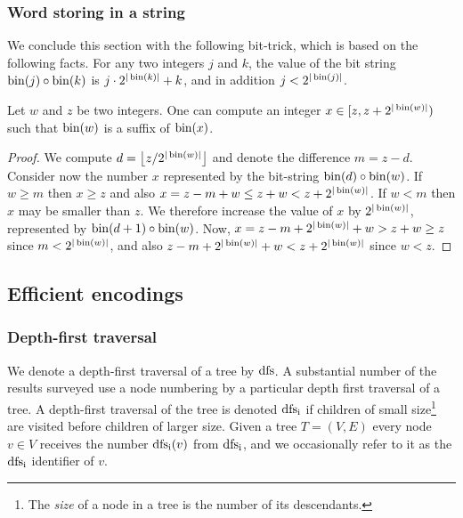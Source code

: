 \subsubsection{Word storing in a string}\label{tec:wordinside}
	We conclude this section with the following  bit-trick, which is based on the following facts.
	For any two integers $j$ and $k$, the value of the bit string $\operatorname{bin}(j) \circ \operatorname{bin}(k)$ is $j \cdot 2^{\vert\operatorname{bin}(k)\vert}+k$, and in addition $j<2^{\vert \operatorname{bin}(j)\vert}$.
			\begin{lemma} \label{lemma:numberinside}
			Let $w$ and $z$ be two integers. One can compute  an integer $x \in [z,z+2^{ \vert \operatorname{bin}(w) \vert} )$ such that $\operatorname{bin}(w)$ is a suffix of $\operatorname{bin}(x)$.
			\end{lemma}
			\begin{proof}
			 We  compute $d = \left\lfloor{z/ 2^{\vert \operatorname{bin}(w) \vert}}\right\rfloor$ and denote the difference $m = z-d$.
			 Consider now the number $x$ represented by the bit-string $ \operatorname{bin}(d) \circ \operatorname{bin}(w)$.
			 If $w \geq m$  then $x \geq z$ and also   $x=z-m+w \leq z+w < z + 2^{\vert  \operatorname{bin}(w) \vert}$. 
			 If $w < m$ then $x$ may be smaller than $z$. 
			 We therefore increase the value of  $x$ by  $2^{\vert \operatorname{bin}(w) \vert}$, represented by  $\operatorname{bin}(d+1) \circ \operatorname{bin}(w)$.	
			 Now, $x = z- m + 2^{\vert  \operatorname{bin}(w) \vert}  + w > z + w \geq z$ since $m< 2^{\vert \operatorname{bin}(w) \vert}$, and also $z-m+ 2^{\vert \operatorname{bin}(w) \vert} +w < z +  2^{\vert \operatorname{bin}(w) \vert}$ since $w<z$. 
			 \end{proof}
			
\subsection{Efficient encodings}\label{sec:efficient-encoding}
\subsubsection{ Depth-first traversal}\label{tec:dfs}
We denote a depth-first traversal of a tree by $\operatorname{dfs}$.
A substantial number of the results surveyed use  a node numbering  by a  particular depth first traversal of a tree.
A depth-first traversal of the tree is denoted $\operatorname{dfs_i}$ if  children of small size\footnote{The \emph{size} of a node in a tree is the number of its descendants.} are visited before children of larger size. 
Given a tree $T=(V,E)$  every node $v \in V$ receives the number $\operatorname{dfs_i}(v)$ from $\operatorname{dfs_i}$, and we occasionally refer to it as the $\operatorname{dfs_i}$ identifier of $v$.


